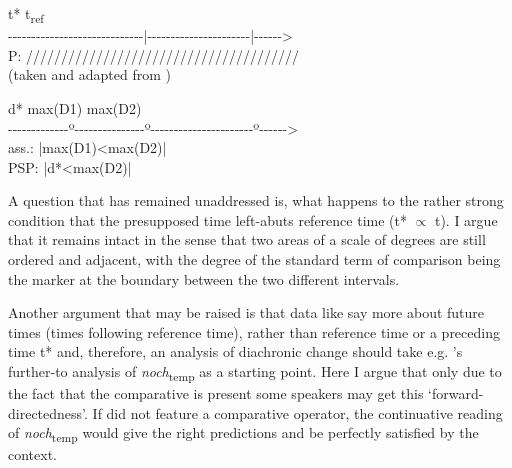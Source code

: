 \documentclass[output=paper,
modfonts
]{langscibook}
\begin{document}
\ea\label{diagram_temp_comp}
\ea \noindent\parbox[t]{\linewidth}{\hspace{43pt} t* \hspace{80pt} t\textsubscript{ref}\\
{-}{-}{-}{-}{-}{-}{-}{-}{-}{-}{-}{-}{-}{-}{-}{-}{-}{-}{-}{-}{-}{-}{-}{-}{-}{-}{-}{-}{-}{|}{-}{-}{-}{-}{-}{-}{-}{-}{-}{-}{-}{-}{-}{-}{-}{-}{-}{-}{-}{-}{-}{-}{|}{-}{-}{-}{-}{-}{-}>\\
P: \hspace{40pt}///////////////////////////////////////\\ (taken and adapted from \citealt{beck2016a_sub})}
\ex \noindent\parbox[t]{\linewidth}{\hspace{43pt} d* \hspace{30pt} max(D1) \hspace{42pt} max(D2)\\
{-}{-}{-}{-}{-}{-}{-}{-}{-}{-}{-}{-}{-}{º}{-}{-}{-}{-}{-}{-}{-}{-}{-}{-}{-}{-}{-}{-}{-}{º}{-}{-}{-}{-}{-}{-}{-}{-}{-}{-}{-}{-}{-}{-}{-}{-}{-}{-}{-}{-}{-}{-}{º}{-}{-}{-}{-}{-}{-}>\\
ass.: \hspace{85pt}|\hspace{1.125pt}max(D1)<max(D2)\hspace{1.125pt}|\\
PSP: \hspace{25pt}|\hspace{1pt}d*<max(D2)\hspace{1pt}|}
\z\z


A question that has remained unaddressed is, what happens to the rather strong condition that the presupposed time left-abuts reference time (t* $\propto$ t). I argue that it remains intact in the sense that two areas of a scale of degrees are still ordered and adjacent, with the degree of the standard term of comparison being the marker at the boundary between the two different intervals.

Another argument that may be raised is that data like  say more about future times (times following reference time), rather than reference time or a preceding time t* and, therefore, an analysis of diachronic change should take e.g. \citeauthor{beck2016a_sub}'s \citeyearpar{beck2016a_sub} further-to analysis of \textit{noch}\textsubscript{temp} as a starting point. Here I argue that only due to the fact that the comparative is present some speakers may get this `forward-directedness'. If  did not feature a comparative operator, the continuative reading of \textit{noch}\textsubscript{temp} would give the right predictions and be perfectly satisfied by the context. 
\end{document}
